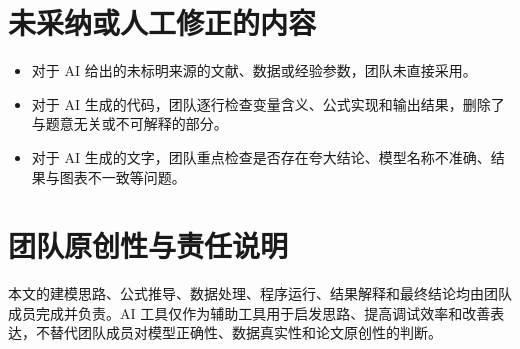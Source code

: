 \documentclass[a4paper]{ctexart}
\begin{document}
\section{未采纳或人工修正的内容}

\begin{itemize}
  \item 对于 AI 给出的未标明来源的文献、数据或经验参数，团队未直接采用。
  \item 对于 AI 生成的代码，团队逐行检查变量含义、公式实现和输出结果，删除了与题意无关或不可解释的部分。
  \item 对于 AI 生成的文字，团队重点检查是否存在夸大结论、模型名称不准确、结果与图表不一致等问题。
\end{itemize}

\section{团队原创性与责任说明}

本文的建模思路、公式推导、数据处理、程序运行、结果解释和最终结论均由团队成员完成并负责。AI 工具仅作为辅助工具用于启发思路、提高调试效率和改善表达，不替代团队成员对模型正确性、数据真实性和论文原创性的判断。
\end{document}

